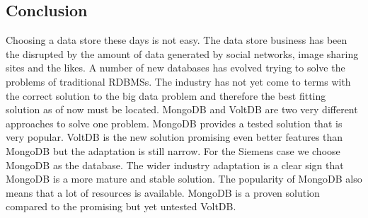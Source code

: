 \subsection{Conclusion}
Choosing a data store these days is not easy. The data store business has been the disrupted by the amount of data generated by social networks, image sharing sites and the likes. 
A number of new databases has evolved trying to solve the problems of traditional RDBMSs. 
The industry has not yet come to terms with the correct solution to the big data problem and therefore the best fitting solution as of now must be located.
MongoDB and VoltDB are two very different approaches to solve one problem.
MongoDB provides a tested solution that is very popular. VoltDB is the new solution promising even better features than MongoDB but the adaptation is still narrow.
For the Siemens case we choose MongoDB as the database.
The wider industry adaptation is a clear sign that MongoDB is a more mature and stable solution.
The popularity of MongoDB also means that a lot of resources is available.
MongoDB is a proven solution compared to the promising but yet untested VoltDB.